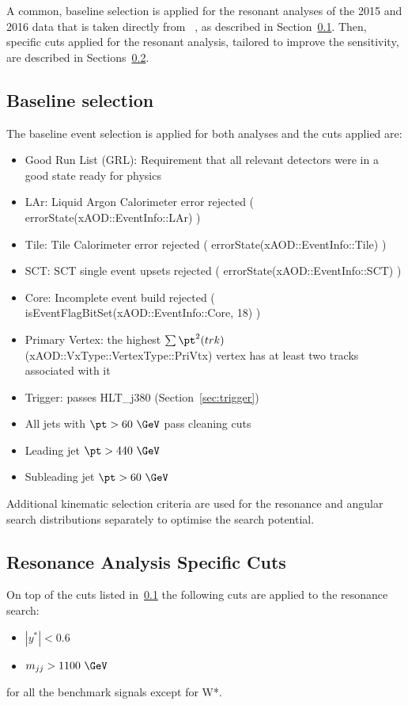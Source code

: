 A common, baseline selection is applied for the resonant  analyses of the 2015 and 2016 data that is taken directly from ~\cite{Bauce:2226443}, as described in Section~\ref{sec:base_selection}. Then, specific cuts applied
for the resonant analysis, tailored to improve the sensitivity, are described in Sections~\ref{sec:res_selection}. 

\subsection{Baseline selection}
\label{sec:base_selection}
The baseline event selection is applied for both analyses and
the cuts applied are:
\begin{itemize}
\label{item:basicSelection}
\item Good Run List (GRL): Requirement that all relevant detectors were in a good state ready for physics
\item LAr: Liquid Argon Calorimeter error rejected ( errorState(xAOD::EventInfo::LAr) )
\item Tile: Tile Calorimeter error rejected ( errorState(xAOD::EventInfo::Tile) )
\item SCT: SCT single event upsets rejected ( errorState(xAOD::EventInfo::SCT) )
\item Core: Incomplete event build rejected ( isEventFlagBitSet(xAOD::EventInfo::Core, 18) )
\item Primary Vertex: the highest $\sum\pt^{2}(trk)$ (xAOD::VxType::VertexType::PriVtx) vertex has at least two tracks associated with it
\item Trigger: passes HLT\_j380 (Section~\ref{sec:trigger})
\item All jets with $\pt>60~\GeV$ pass cleaning cuts
\item Leading jet $\pt>440~\GeV$
\item Subleading jet $\pt>60~\GeV$
\end{itemize}

Additional kinematic selection criteria are used for the resonance and angular search distributions separately to optimise the search potential.


\subsection{Resonance Analysis Specific Cuts}
\label{sec:res_selection}
On top of the cuts listed in~\ref{sec:base_selection}
the following cuts are applied to the resonance search:
\begin{itemize}
\item $|y^*| < 0.6$
\item $\mjj > 1100~\GeV$ %
\end{itemize}
for all the benchmark signals except for W*.

